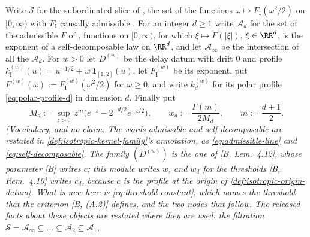 \begin{definition}
\label{def:filtration-thresholds}
\leanok
Write $\mathcal{S}$ for the subordinated slice of , the set of the functions
$\omega \mapsto F_{\mathrm I}(\omega^2/2)$ on $[0,\infty)$ with $F_{\mathrm I}$ causally admissible
. For an integer $d \ge 1$ write $\mathcal{A}_d$ for the set of the admissible
$F$ of , functions on $[0,\infty)$, for which
$\xi \mapsto F(|\xi|)$, $\xi \in \RR^d$, is the exponent of a self-decomposable law on $\RR^d$, and
let $\mathcal{A}_\infty$ be the intersection of all the $\mathcal{A}_d$. For $w > 0$ let
$D^{(w)}$ be the delay datum  with drift $0$ and profile
$k^{(w)}_{\mathrm I}(u) = u^{-1/2} + w\,\mathbf{1}_{[1,2]}(u)$, let $F^{(w)}_{\mathrm I}$ be its
exponent, put $F^{(w)}(\omega) := F^{(w)}_{\mathrm I}(\omega^2/2)$ for $\omega \ge 0$, and write
$k^{(w)}_d$ for its polar profile \ref{eq:polar-profile-d} in dimension $d$. Finally put
\begin{equation}\label{eq:threshold-constant}
  M_d := \sup_{z>0}\, z^m\bigl(e^{-z} - 2^{-d/2}e^{-z/2}\bigr),
  \qquad w_d := \frac{\Gamma(m)}{2M_d}, \qquad m := \frac{d+1}{2} .
\end{equation}
\statusT\quad\emph{(Vocabulary, and no claim. The words \emph{admissible} and
\emph{self-decomposable} are restated in \ref{def:isotropic-kernel-family}'s annotation, as
\ref{eq:admissible-line} and \ref{eq:self-decomposable}. The family $(D^{(w)})$ is the one of
[B, Lem.~4.12], whose parameter [B] writes $c$; this module writes $w$, and $w_d$ for the
thresholds [B, Rem.~4.10] writes $c_d$, because $c$ is the profile at the origin of
\ref{def:isotropic-origin-datum}. What is new here is \ref{eq:threshold-constant}, which names
the threshold that the criterion [B, (A.2)] defines, and the two nodes that follow. The released
facts about these objects are restated where they are used: the filtration
$\mathcal{S} = \mathcal{A}_\infty \subseteq \dots \subseteq \mathcal{A}_2 \subseteq \mathcal{A}_1$,
}
\end{definition}
